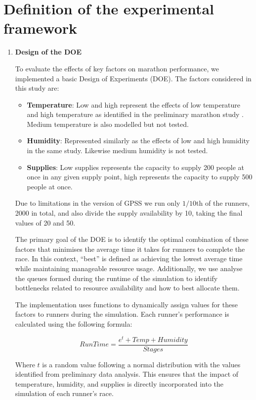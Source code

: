 \documentclass[conference]{IEEEtran}
\begin{document}
\section{Definition of the experimental framework}
\begin{enumerate}
    \item \textbf{Design of the DOE}
    
    To evaluate the effects of key factors on marathon performance, we implemented a basic Design of Experiments (DOE). The factors considered in this study are:
    \begin{itemize}
        \item \textbf{Temperature}: Low and high represent the effects of low temperature and high temperature as identified in the preliminary marathon study \cite{b8}. Medium temperature is also modelled but not tested.
        \item \textbf{Humidity}: Represented similarly as the effects of low and high humidity in the same study. Likewise medium humidity is not tested.
        \item \textbf{Supplies}: Low supplies represents the capacity to supply 200 people at once in any given supply point, high represents the capacity to supply 500 people at once.
    \end{itemize}

    Due to limitations in the version of GPSS we run only $1/10$th of the runners, 2000 in total, and also divide the supply availability by 10, taking the final values of 20 and 50.

    The primary goal of the DOE is to identify the optimal combination of these factors that minimises the average time it takes for runners to complete the race. In this context, “best” is defined as achieving the lowest average time while maintaining manageable resource usage. Additionally, we use analyse the queues formed during the runtime of the simulation to identify bottlenecks related to resource availability and how to best allocate them.
    
    The implementation uses functions to dynamically assign values for these factors to runners during the simulation. Each runner’s performance is calculated using the following formula:

    \[
        Run Time = \frac{e^t+Temp+Humidity}{Stages}
    \]

    Where $t$ is a random value following a normal distribution with the values identified from preliminary data analysis. This ensures that the impact of temperature, humidity, and supplies is directly incorporated into the simulation of each runner's race.


\end{enumerate}
\end{document}
